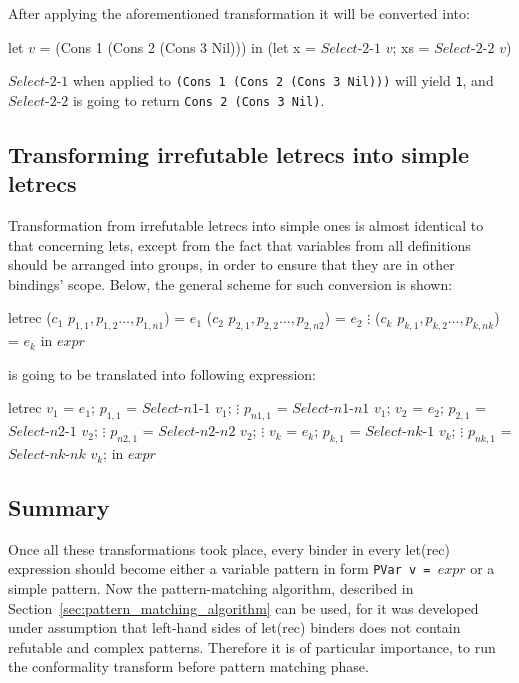 \documentclass[12pt,a4paper]{report}
\begin{document}
After applying the aforementioned transformation it will be converted into:

\vspace*{0.2in}
\begin{code}[style=haskell,mathescape=true]
let $v$ = (Cons 1 (Cons 2 (Cons 3 Nil)))
in (let x  = $Select\mbox{-}2\mbox{-}1$ $v$;
        xs = $Select\mbox{-}2\mbox{-}2$ $v$)
\end{code}

$Select\mbox{-}2\mbox{-}1$ when applied to \texttt{(Cons 1 (Cons 2 (Cons 3
Nil)))} will yield \texttt{1}, and $Select\mbox{-}2\mbox{-}2$ is going to return
\texttt{Cons 2 (Cons 3 Nil)}.

\subsection{Transforming irrefutable letrecs into simple letrecs}
Transformation from irrefutable letrecs into simple ones is almost identical to
that concerning lets, except from the fact that variables from all definitions
should be arranged into groups, in order to ensure that they are in other
bindings' scope. Below, the general scheme for such conversion is shown:

\vspace*{0.2in}
\begin{code}[style=haskell,mathescape=true]
letrec ($c_1$ $p_{1,1}, p_{1,2} \ldots, p_{1,n1}$) = $e_1$
       ($c_2$ $p_{2,1}, p_{2,2} \ldots, p_{2,n2}$) = $e_2$
                $\vdots$
       ($c_k$ $p_{k,1}, p_{k,2} \ldots, p_{k,nk}$) = $e_k$
in $expr$
\end{code}

is going to be translated into following expression:

\vspace*{0.2in}
\begin{code}[style=haskell,mathescape=true]
letrec
    $v_1$ = $e_1$;
    $p_{1,1}$ = $Select\mbox{-}n1\mbox{-}1$ $v_1$;
              $\vdots$
    $p_{n1,1}$ = $Select\mbox{-}n1\mbox{-}n1$ $v_1$;
    $v_2$ = $e_2$;
    $p_{2,1}$ = $Select\mbox{-}n2\mbox{-}1$ $v_2$;
              $\vdots$
    $p_{n2,1}$ = $Select\mbox{-}n2\mbox{-}n2$ $v_2$;
              $\vdots$
    $v_k$ = $e_k$;
    $p_{k,1}$ = $Select\mbox{-}nk\mbox{-}1$ $v_k$;
              $\vdots$
    $p_{nk,1}$ = $Select\mbox{-}nk\mbox{-}nk$ $v_k$;
in $expr$
\end{code}

\subsection{Summary}
Once all these transformations took place, every binder in every let(rec)
expression should become either a variable pattern in form \texttt{PVar v =
$expr$} or a simple pattern. Now the pattern-matching algorithm, described in
Section~\ref{sec:pattern_matching_algorithm} can be used, for it was developed
under assumption that left-hand sides of let(rec) binders does not contain
refutable and complex patterns. Therefore it is of particular importance, to
run the conformality transform before pattern matching phase.
\end{document}
